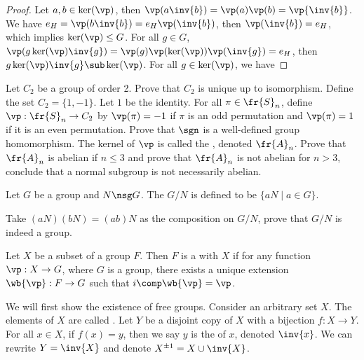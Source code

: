 \documentclass[10pt]{article}
\begin{document}
\begin{proof}
    Let $a,b\in\ker(\vp)$, then $\vp(a\inv{b})=\vp(a)\vp(b)=\vp{\inv{b}}$. We have ${e}_{H}=\vp(b\inv{b})={e}_{H}\vp(\inv{b})$, then $\vp({\inv{b}})={e}_{H}$, which implies $\ker(\vp)\le G$. For all $g\in G$, $\vp(g\ker(\vp)\inv{g})=\vp(g)\vp(\ker(\vp))\vp(\inv{g})={e}_{H}$, then $g\ker(\vp)\inv{g}\sub\ker(\vp)$. For all $g\in\ker(\vp)$, we have 
\end{proof}
\begin{problem}
    Let ${C}_{2}$ be a group of order 2. Prove that ${C}_{2}$ is unique up to isomorphism. Define the set ${C}_{2}=\{1,-1\}$. Let $1$ be the identity. For all $\pi\in{\fr{S}}_{n}$, define $\vp:{\fr{S}}_{n}\to{C}_{2}$ by $\vp(\pi)=-1$ if $\pi$ is an odd permutation and $\vp(\pi)=1$ if it is an even permutation. Prove that $\sgn$ is a well-defined group homomorphism. The kernel of $\vp$ is called the , denoted ${\fr{A}}_{n}$. Prove that ${\fr{A}}_{n}$ is abelian if $n\le 3$ and prove that ${\fr{A}}_{n}$ is not abelian for $n>3$, conclude that a normal subgroup is not necessarily abelian.
\end{problem}
\begin{definition}
    Let $G$ be a group and $N\nsg G$. The  $G/N$ is defined to be $\{aN\mid a\in G\}$. 
\end{definition}
\begin{problem}
    Take $(aN)(bN)=(ab)N$ as the composition on $G/N$, prove that $G/N$ is indeed a group.
\end{problem}
\begin{definition}
    Let $X$ be a subset of a group $F$. Then $F$ is a  with  $X$ if for any function $\vp:X\to G$, where $G$ is a group, there exists a unique extension $\wb{\vp}:F\to G$ such that $i\comp\wb{\vp}=\vp$.
\end{definition}
\begin{center}
\end{center}
\par
We will first show the existence of free groups. Consider an arbitrary set $X$. The elements of $X$ are called . Let $Y$ be a disjoint copy of $X$ with a bijection $f:X\to Y$. For all $x\in X$, if $f(x)=y$, then we say $y$ is the  of $x$, denoted $\inv{x}$. We can rewrite $Y=\inv{X}$ and denote ${X}^{\pm 1}=X\cup\inv{X}$.
\end{document}
